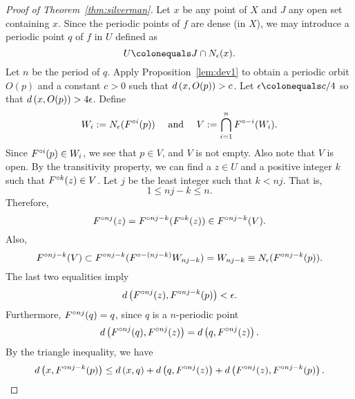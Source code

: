 \documentclass[12pt,draft,twoside]{book}
\begin{document}
  \begin{proof}[Proof of Theorem~\ref{thm:silverman}]
    Let $x$ be any point of $X$ and $J$ any open set containing $x$.
    Since the periodic points of $f$ are dense (in $X$), we may introduce a periodic point
    $q$ of $f$ in $U$ defined as
    \begin{equation*}
      U \ceq J\cap \oball{\epsilon}{x}.
    \end{equation*}
    Let $n$ be the period of $q$.
    Apply Proposition~\ref{lem:dev1} to obtain a periodic orbit $O(p)$ and a constant $c > 0$ such that $d\left( x, O(p) \right) > c$.
    Let $\epsilon \ceq c/4$ so that $d\left( x, O(p) \right) > 4\epsilon$.
    Define
    \begin{equation*}
      W_i := N_{\epsilon}(F^{\circ i}(p)) \quad\text{ and }\quad V := \bigcap\limits_{i = 1}^{n} F^{\circ -i}(W_i).
    \end{equation*}
    Since $F^{\circ i}(p) \in W_i$, we see that $p \in V$, and $V$ is not empty. 
    Also note that $V$ is open.
    By the transitivity property, we can find a $z\in U$ and a positive integer $k$ such that
    $F^{\circ k}(z) \in V$. Let $j$ be the least integer such that $k < nj$. 
    That is,
    \begin{equation*}
      1 \leq nj - k \leq n.
    \end{equation*}
    Therefore,
    \begin{equation*}
      F^{\circ nj} (z) = F^{\circ nj - k} (F^{\circ k}(z)) \in F^{\circ nj-k}(V).
    \end{equation*}
    Also,
    \begin{equation*}
      F^{\circ nj - k}(V) \subset F^{\circ nj - k}(F^{\circ -(nj - k)} W_{nj-k}) 
      = W_{nj-k}
      \equiv N_{\epsilon}(F^{\circ nj-k}(p)).
    \end{equation*}
    The last two equalities imply
    \begin{equation*}
      d\left( F^{\circ nj}(z), F^{\circ nj - k}(p) \right) < \epsilon.
    \end{equation*}
    Furthermore, $F^{\circ nj}(q) = q$, since $q$ is a $n$-periodic point 
    \begin{equation*}
      d\left( F^{\circ nj}(q), F^{\circ nj}(z) \right) = d\left( q, F^{\circ nj}(z) \right).
    \end{equation*}
    By the triangle inequality, we have
    \begin{equation*}
      d\left( x, F^{\circ nj-k}(p) \right) \leq d\left( x,q \right) + d\left( q, F^{\circ nj}(z) \right) + d\left( F^{\circ nj}(z), F^{\circ nj - k}(p) \right).
    \end{equation*}

\end{proof}
\end{document}
